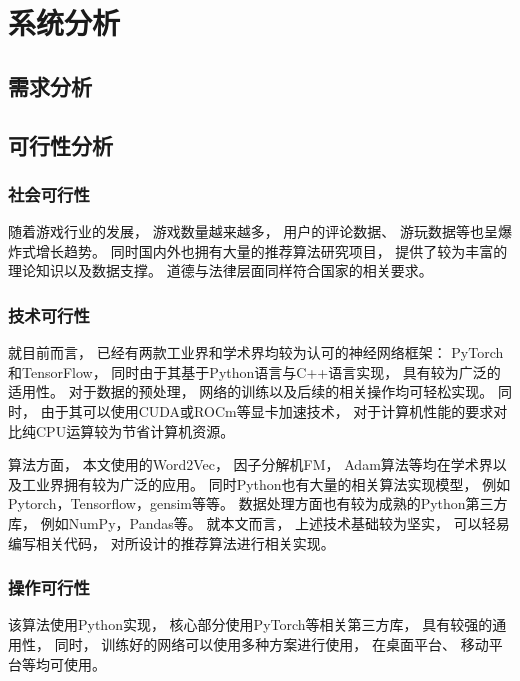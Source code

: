 \section{系统分析}

\subsection{需求分析}

\subsection{可行性分析}

\subsubsection{社会可行性}

随着游戏行业的发展，
游戏数量越来越多，
用户的评论数据、
游玩数据等也呈爆炸式增长趋势。
同时国内外也拥有大量的推荐算法研究项目，
提供了较为丰富的理论知识以及数据支撑。
道德与法律层面同样符合国家的相关要求。

\subsubsection{技术可行性}

就目前而言，
已经有两款工业界和学术界均较为认可的神经网络框架：
PyTorch和TensorFlow，
同时由于其基于Python语言与C++语言实现，
具有较为广泛的适用性。
对于数据的预处理，
网络的训练以及后续的相关操作均可轻松实现。
同时，
由于其可以使用CUDA或ROCm等显卡加速技术，
对于计算机性能的要求对比纯CPU运算较为节省计算机资源。

算法方面，
本文使用的Word2Vec，
因子分解机FM，
Adam算法等均在学术界以及工业界拥有较为广泛的应用。
同时Python也有大量的相关算法实现模型，
例如Pytorch，Tensorflow，gensim等等。
数据处理方面也有较为成熟的Python第三方库，
例如NumPy，Pandas等。
就本文而言，
上述技术基础较为坚实，
可以轻易编写相关代码，
对所设计的推荐算法进行相关实现。

\subsubsection{操作可行性}

该算法使用Python实现，
核心部分使用PyTorch等相关第三方库，
具有较强的通用性，
同时，
训练好的网络可以使用多种方案进行使用，
在桌面平台、
移动平台等均可使用。